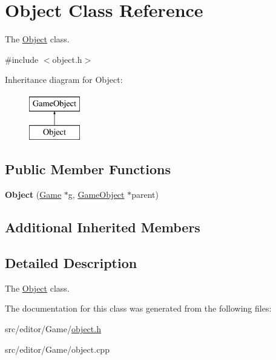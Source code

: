 \hypertarget{class_object}{}\section{Object Class Reference}
\label{class_object}


The \hyperlink{class_object}{Object} class.  




{\ttfamily \#include $<$object.\+h$>$}

Inheritance diagram for Object\+:\begin{figure}[H]
\begin{center}
\leavevmode
\includegraphics[height=2.000000cm]{class_object}
\end{center}
\end{figure}
\subsection*{Public Member Functions}
\begin{DoxyCompactItemize}
\item 
\hypertarget{class_object_a5e05d43825eadd0b6868544c22bc4269}{}\label{class_object_a5e05d43825eadd0b6868544c22bc4269} 
{\bfseries Object} (\hyperlink{class_game}{Game} $\ast$g, \hyperlink{class_game_object}{Game\+Object} $\ast$parent)
\end{DoxyCompactItemize}
\subsection*{Additional Inherited Members}


\subsection{Detailed Description}
The \hyperlink{class_object}{Object} class. 

The documentation for this class was generated from the following files\+:\begin{DoxyCompactItemize}
\item 
src/editor/\+Game/\hyperlink{object_8h}{object.\+h}\item 
src/editor/\+Game/object.\+cpp\end{DoxyCompactItemize}
